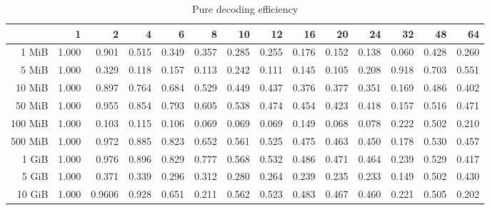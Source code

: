 \begin{centering}
\begin{table}[!h]
	\caption{Pure decoding efficiency}
	\begin{tabular}{rrrrrrrrrrrrrr}
		\toprule
		\diagbox[width=7em]{Sizes}{Threads} & 1  &    2  &    4  &    6  &    8  &    10 &    12 &    16 &    20 &    24 &    32 &    48 &    64 \\
		\midrule
		1 MiB   & 1.000 & 0.901 & 0.515 & 0.349 & 0.357 & 0.285 & 0.255 & 0.176 & 0.152 & 0.138 & 0.060 & 0.428 & 0.260 \\
		5 MiB   & 1.000 & 0.329 & 0.118 & 0.157 & 0.113 & 0.242 & 0.111 & 0.145 & 0.105 & 0.208 & 0.918 & 0.703 & 0.551 \\
		10 MiB  & 1.000 & 0.897 & 0.764 & 0.684 & 0.529 & 0.449 & 0.437 & 0.376 & 0.377 & 0.351 & 0.169 & 0.486 & 0.402 \\
		50 MiB  & 1.000 & 0.955 & 0.854 & 0.793 & 0.605 & 0.538 & 0.474 & 0.454 & 0.423 & 0.418 & 0.157 & 0.516 & 0.471 \\
		100 MiB & 1.000 & 0.103 & 0.115 & 0.106 & 0.069 & 0.069 & 0.069 & 0.149 & 0.068 & 0.078 & 0.222 & 0.502 & 0.210 \\
		500 MiB & 1.000 & 0.972 & 0.885 & 0.823 & 0.652 & 0.561 & 0.525 & 0.475 & 0.463 & 0.450 & 0.178 & 0.530 & 0.457 \\
		1 GiB   & 1.000 & 0.976 & 0.896 & 0.829 & 0.777 & 0.568 & 0.532 & 0.486 & 0.471 & 0.464 & 0.239 & 0.529 & 0.417 \\
		5 GiB   & 1.000 & 0.371 & 0.339 & 0.296 & 0.312 & 0.280 & 0.264 & 0.239 & 0.235 & 0.233 & 0.149 & 0.502 & 0.430 \\
		10 GiB  & 1.000 & 0.9606 & 0.928 & 0.651 & 0.211 & 0.562 & 0.523 & 0.483 & 0.467 & 0.460 & 0.221 & 0.505 & 0.202 \\
		\bottomrule
	\end{tabular}
\end{table}
\end{centering}
